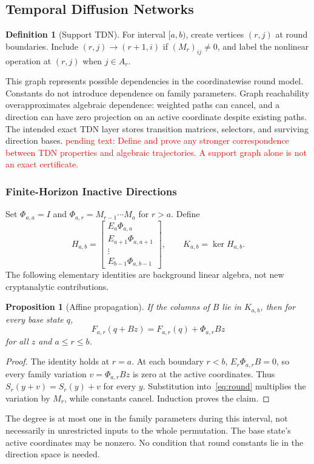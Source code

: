\documentclass[conference]{IEEEtran}
\theoremstyle{definition}
\newtheorem{definition}{Definition}
\theoremstyle{plain}
\newtheorem{proposition}{Proposition}
\begin{document}
\subsection{Temporal Diffusion Networks}
\begin{definition}[Support TDN]
For interval $[a,b)$, create vertices $(r,j)$ at round boundaries.
Include $(r,j)\to(r+1,i)$ if $(M_r)_{ij}\ne0$, and label the
nonlinear operation at $(r,j)$ when $j\in A_r$.
\end{definition}
This graph represents possible dependencies in the coordinatewise round
model. Constants do not introduce dependence on family parameters.
Graph reachability overapproximates algebraic dependence: weighted paths
can cancel, and a direction can have zero projection on an active
coordinate despite existing paths.
The intended exact TDN layer stores transition matrices, selectors, and
surviving direction bases.
\textcolor{red}{pending text: Define and prove any stronger correspondence
between TDN properties and algebraic trajectories. A support graph alone
is not an exact certificate.}
\subsubsection{Finite-Horizon Inactive Directions}
Set $\Phi_{a,a}=I$ and $\Phi_{a,r}=M_{r-1}\cdots M_a$ for $r>a$.
Define
\begin{equation}
H_{a,b}=
\begin{bmatrix}
E_a\Phi_{a,a}\\ E_{a+1}\Phi_{a,a+1}\\ \vdots\\
E_{b-1}\Phi_{a,b-1}
\end{bmatrix},
\qquad K_{a,b}=\ker H_{a,b}.
\label{eq:observability}
\end{equation}
The following elementary identities are background linear algebra,
not new cryptanalytic contributions.

\begin{proposition}[Affine propagation]
\label{prop:affine}
If the columns of $B$ lie in $K_{a,b}$, then for every base state $q$,
\begin{equation}
F_{a,r}(q+Bz)=F_{a,r}(q)+\Phi_{a,r}Bz
\label{eq:affine}
\end{equation}
for all $z$ and $a\le r\le b$.
\end{proposition}
\begin{proof}
The identity holds at $r=a$. At each boundary $r<b$,
$E_r\Phi_{a,r}B=0$, so every family variation $v=\Phi_{a,r}Bz$
is zero at the active coordinates. Thus $S_r(y+v)=S_r(y)+v$
for every $y$. Substitution into~\eqref{eq:round} multiplies the
variation by $M_r$, while constants cancel. Induction proves the claim.
\end{proof}
The degree is at most one in the family parameters during this interval,
not necessarily in unrestricted inputs to the whole permutation.
The base state's active coordinates may be nonzero. No condition that
round constants lie in the direction space is needed.
\end{document}
